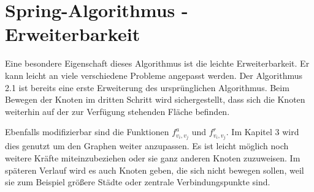   
\section{Spring-Algorithmus - Erweiterbarkeit}
\label{Kapitel_2_-_Unterkapitel_3}   
Eine besondere Eigenschaft dieses Algorithmus ist die leichte Erweiterbarkeit. Er kann leicht an viele verschiedene Probleme angepasst werden.
Der Algorithmus 2.1 ist bereits eine erste Erweiterung des ursprünglichen Algorithmus. Beim Bewegen der Knoten im dritten Schritt wird sichergestellt, dass sich die Knoten weiterhin auf der zur Verfügung stehenden Fläche befinden.

Ebenfalls modifizierbar sind die Funktionen $f^{a}_{v_{i},v_{j}}$ und $f^{r}_{v_{i},v_{j}}$. Im Kapitel 3 wird dies genutzt um den Graphen weiter anzupassen. Es ist leicht möglich noch weitere Kräfte miteinzubeziehen oder sie ganz anderen Knoten zuzuweisen. Im späteren Verlauf wird es auch Knoten geben, die sich nicht bewegen sollen, weil sie zum Beispiel größere Städte oder zentrale Verbindungspunkte sind.

%
